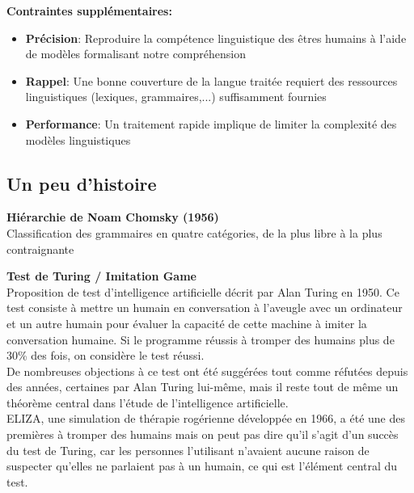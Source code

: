 \noindent\textbf{Contraintes supplémentaires:}

\begin{itemize}
    \item \textbf{Précision}: Reproduire la compétence linguistique des êtres humains à l'aide de modèles
    formalisant notre compréhension
    \item \textbf{Rappel}: Une bonne couverture de la langue traitée requiert des ressources
    linguistiques (lexiques, grammaires,...) suffisamment fournies
    \item \textbf{Performance}: Un traitement rapide implique de limiter la complexité des modèles linguistiques
\end{itemize}

\subsection{Un peu d'histoire}

\textbf{Hiérarchie de Noam Chomsky (1956)} \\

Classification des grammaires en quatre catégories, de la plus libre à la plus contraignante

\vspace{1cm}

\resizebox{0.9\textwidth}{!}{
    
}

\newpage

\textbf{Test de Turing / Imitation Game} \\

Proposition de test d'intelligence artificielle décrit par Alan Turing en 1950. Ce test consiste à mettre un humain en conversation à l'aveugle avec un ordinateur et un autre humain pour évaluer la capacité de cette machine à imiter la conversation humaine. Si le programme réussis à tromper des humains plus de 30\% des fois, on considère le test réussi. \\

De nombreuses objections à ce test ont été suggérées tout comme réfutées depuis des années, certaines par Alan Turing lui-même, mais il reste tout de même un théorème central dans l'étude de l'intelligence artificielle. \\

ELIZA, une simulation de thérapie rogérienne développée en 1966, a été une des premières à tromper des humains mais on peut pas dire qu'il s'agit d'un succès du test de Turing, car les personnes l'utilisant n'avaient aucune raison de suspecter qu'elles ne parlaient pas à un humain, ce qui est l'élément central du test. \\

